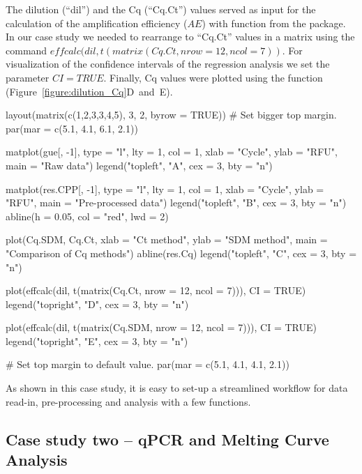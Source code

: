 The dilution (``dil'') and the Cq (``Cq.Ct'') values served as input for the 
calculation of the amplification efficiency ($AE$) with  function 
from the  package. In our case study we needed to rearrange to 
``Cq.Ct'' values in a matrix using the command $effcalc(dil, t(matrix(Cq.Ct, 
nrow = 12, ncol = 7))$. For visualization of the confidence intervals of the 
regression analysis we set the parameter $CI = TRUE$. Finally, Cq values were plotted 
using the  function (Figure~\ref{figure:dilution_Cq}D~and~E).

\begin{example}
layout(matrix(c(1,2,3,3,4,5), 3, 2, byrow = TRUE))
# Set bigger top margin.
par(mar = c(5.1, 4.1, 6.1, 2.1))

matplot(gue[, -1], type = "l", lty = 1, col = 1, xlab = "Cycle", 
	    ylab = "RFU", main = "Raw data")
legend("topleft", "A", cex = 3, bty = "n")

matplot(res.CPP[, -1], type = "l", lty = 1, col = 1, xlab = "Cycle", 
	ylab = "RFU", main = "Pre-processed data")
legend("topleft", "B", cex = 3, bty = "n")
abline(h = 0.05, col = "red", lwd = 2)

plot(Cq.SDM, Cq.Ct, xlab = "Ct method", ylab = "SDM method", 
     main = "Comparison of Cq methods")
abline(res.Cq)
legend("topleft", "C", cex = 3, bty = "n")

plot(effcalc(dil, t(matrix(Cq.Ct, nrow = 12, ncol = 7))), CI = TRUE)
legend("topright", "D", cex = 3, bty = "n")

plot(effcalc(dil, t(matrix(Cq.SDM, nrow = 12, ncol = 7))), CI = TRUE)
legend("topright", "E", cex = 3, bty = "n")

# Set top margin to default value.
par(mar = c(5.1, 4.1, 4.1, 2.1))
\end{example}

As shown in this case study, it is easy to set-up a streamlined workflow for data 
read-in, pre-processing and analysis with a few functions.

\subsection{Case study two -- qPCR and Melting Curve Analysis}

